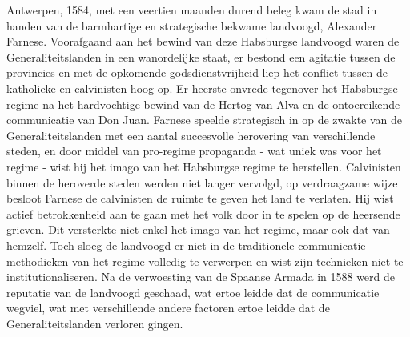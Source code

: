 \documentclass[11pt]{amsart}
\begin{document}






\noindent Antwerpen, 1584, met een veertien maanden durend beleg kwam de stad in handen van de barmhartige en
strategische bekwame landvoogd, Alexander Farnese. Voorafgaand aan het bewind van deze Habsburgse landvoogd waren de
Generaliteitslanden in een wanordelijke staat, er bestond een agitatie tussen de provincies en met de opkomende
godsdienstvrijheid liep het conflict tussen de katholieke en calvinisten hoog op. Er heerste
onvrede tegenover het Habsburgse regime na het hardvochtige bewind van de Hertog van Alva en de ontoereikende communicatie van Don Juan.
Farnese speelde strategisch in op de zwakte van de Generaliteitslanden met een
aantal succesvolle herovering van verschillende steden, en door middel van pro-regime propaganda - wat uniek was voor
het regime - wist hij het imago van het Habsburgse regime te herstellen. Calvinisten binnen de heroverde steden werden
niet langer vervolgd, op verdraagzame wijze besloot Farnese de calvinisten de ruimte te geven het land te verlaten.
Hij wist actief betrokkenheid aan te gaan met het volk door in te spelen op de heersende grieven. Dit versterkte niet
enkel het imago van het regime, maar ook dat van hemzelf. Toch sloeg de landvoogd er niet in de traditionele communicatie
methodieken van het regime volledig te verwerpen en wist zijn technieken niet te institutionaliseren.
Na de verwoesting van de Spaanse Armada in 1588 werd de reputatie van de landvoogd geschaad, wat ertoe leidde dat de
communicatie wegviel, wat met verschillende andere factoren ertoe leidde dat de Generaliteitslanden verloren gingen.
\end{document}
